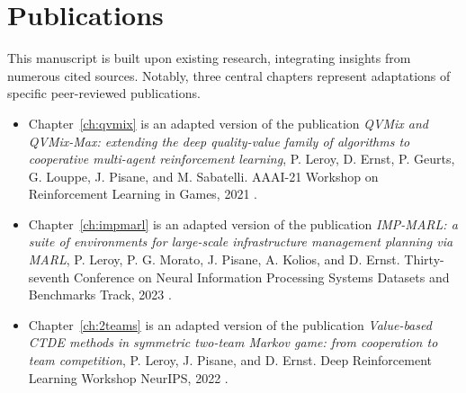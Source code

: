\section{Publications}
\label{sec:ch1_publications}

This manuscript is built upon existing research, integrating insights from numerous cited sources.
Notably, three central chapters represent adaptations of specific peer-reviewed publications.

\begin{itemize}
\item Chapter~\ref{ch:qvmix} is an adapted version of the publication \textit{QVMix and QVMix-Max: extending the deep quality-value family of algorithms to cooperative multi-agent reinforcement learning}, P. Leroy, D. Ernst, P. Geurts, G. Louppe, J. Pisane, and M. Sabatelli. AAAI-21 Workshop on Reinforcement Learning in Games, 2021 \citep{leroy2020qvmix}.

\item Chapter~\ref{ch:impmarl} is an adapted version of the publication \textit{IMP-MARL: a suite of environments for large-scale infrastructure management planning via MARL}, P. Leroy, P. G. Morato, J. Pisane, A. Kolios, and D. Ernst. Thirty-seventh Conference on Neural Information Processing Systems Datasets and Benchmarks Track, 2023 \citep{leroy2023impmarl}.

\item Chapter~\ref{ch:2teams} is an adapted version of the publication \textit{Value-based CTDE methods in symmetric two-team Markov game: from cooperation to team competition}, P. Leroy, J. Pisane, and D. Ernst. Deep Reinforcement Learning Workshop NeurIPS, 2022 \citep{leroy2022twoteam}.
\end{itemize}

